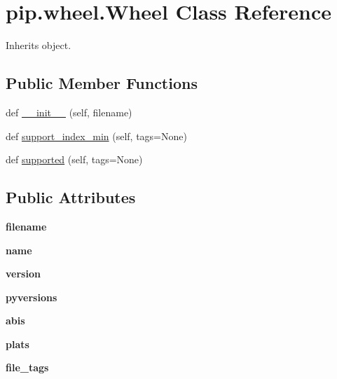 \hypertarget{classpip_1_1wheel_1_1_wheel}{}\section{pip.\+wheel.\+Wheel Class Reference}
\label{classpip_1_1wheel_1_1_wheel}


Inherits object.

\subsection*{Public Member Functions}
\begin{DoxyCompactItemize}
\item 
def \hyperlink{classpip_1_1wheel_1_1_wheel_a3c840ab1d24d7890c3f166ea42e44f77}{\+\_\+\+\_\+init\+\_\+\+\_\+} (self, filename)
\item 
def \hyperlink{classpip_1_1wheel_1_1_wheel_a1bdc31c4f4d945960210b49b5ebff4ba}{support\+\_\+index\+\_\+min} (self, tags=None)
\item 
def \hyperlink{classpip_1_1wheel_1_1_wheel_a3560f244cd5b9ffd12d4d41903df0e47}{supported} (self, tags=None)
\end{DoxyCompactItemize}
\subsection*{Public Attributes}
\begin{DoxyCompactItemize}
\item 
\mbox{\label{classpip_1_1wheel_1_1_wheel_af2982a9ff06313f54b65067a159336a2}} 
{\bfseries filename}
\item 
\mbox{\label{classpip_1_1wheel_1_1_wheel_aa197caa2d016832d81af788b6c795c90}} 
{\bfseries name}
\item 
\mbox{\label{classpip_1_1wheel_1_1_wheel_a5e834b81a8900dfb1a3f36831543d3e2}} 
{\bfseries version}
\item 
\mbox{\label{classpip_1_1wheel_1_1_wheel_aca2b8ea79f186952458292b160dbc6e2}} 
{\bfseries pyversions}
\item 
\mbox{\label{classpip_1_1wheel_1_1_wheel_a8f3a9f6cc2b307822f7bcff8f7fe9f5e}} 
{\bfseries abis}
\item 
\mbox{\label{classpip_1_1wheel_1_1_wheel_add11646ba461d2771a3b427452902ca1}} 
{\bfseries plats}
\item 
\mbox{\label{classpip_1_1wheel_1_1_wheel_a5c2013e838e06edf7e43a6ee9c1ac244}} 
{\bfseries file\+\_\+tags}
\end{DoxyCompactItemize}
